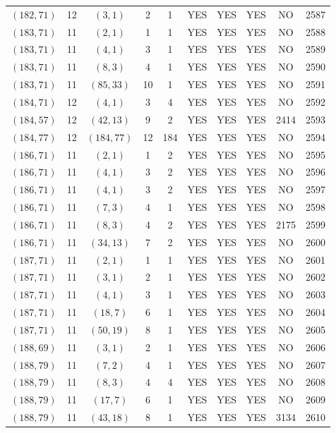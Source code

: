 \begin{longtable}{|c|c|c|c|c|c|c|c|c|c|}
$(182, 71)$ & 12 & $(3, 1)$ & 2 & 1 & YES & YES & YES & NO & 2587\\
$(183, 71)$ & 11 & $(2, 1)$ & 1 & 1 & YES & YES & YES & NO & 2588\\
$(183, 71)$ & 11 & $(4, 1)$ & 3 & 1 & YES & YES & YES & NO & 2589\\
$(183, 71)$ & 11 & $(8, 3)$ & 4 & 1 & YES & YES & YES & NO & 2590\\
$(183, 71)$ & 11 & $(85, 33)$ & 10 & 1 & YES & YES & YES & NO & 2591\\
$(184, 71)$ & 12 & $(4, 1)$ & 3 & 4 & YES & YES & YES & NO & 2592\\
$(184, 57)$ & 12 & $(42, 13)$ & 9 & 2 & YES & YES & YES & 2414 & 2593\\
$(184, 77)$ & 12 & $(184, 77)$ & 12 & 184 & YES & YES & YES & NO & 2594\\
$(186, 71)$ & 11 & $(2, 1)$ & 1 & 2 & YES & YES & YES & NO & 2595\\
$(186, 71)$ & 11 & $(4, 1)$ & 3 & 2 & YES & YES & YES & NO & 2596\\
$(186, 71)$ & 11 & $(4, 1)$ & 3 & 2 & YES & YES & YES & NO & 2597\\
$(186, 71)$ & 11 & $(7, 3)$ & 4 & 1 & YES & YES & YES & NO & 2598\\
$(186, 71)$ & 11 & $(8, 3)$ & 4 & 2 & YES & YES & YES & 2175 & 2599\\
$(186, 71)$ & 11 & $(34, 13)$ & 7 & 2 & YES & YES & YES & NO & 2600\\
$(187, 71)$ & 11 & $(2, 1)$ & 1 & 1 & YES & YES & YES & NO & 2601\\
$(187, 71)$ & 11 & $(3, 1)$ & 2 & 1 & YES & YES & YES & NO & 2602\\
$(187, 71)$ & 11 & $(4, 1)$ & 3 & 1 & YES & YES & YES & NO & 2603\\
$(187, 71)$ & 11 & $(18, 7)$ & 6 & 1 & YES & YES & YES & NO & 2604\\
$(187, 71)$ & 11 & $(50, 19)$ & 8 & 1 & YES & YES & YES & NO & 2605\\
$(188, 69)$ & 11 & $(3, 1)$ & 2 & 1 & YES & YES & YES & NO & 2606\\
$(188, 79)$ & 11 & $(7, 2)$ & 4 & 1 & YES & YES & YES & NO & 2607\\
$(188, 79)$ & 11 & $(8, 3)$ & 4 & 4 & YES & YES & YES & NO & 2608\\
$(188, 79)$ & 11 & $(17, 7)$ & 6 & 1 & YES & YES & YES & NO & 2609\\
$(188, 79)$ & 11 & $(43, 18)$ & 8 & 1 & YES & YES & YES & 3134 & 2610\\

\end{longtable}
